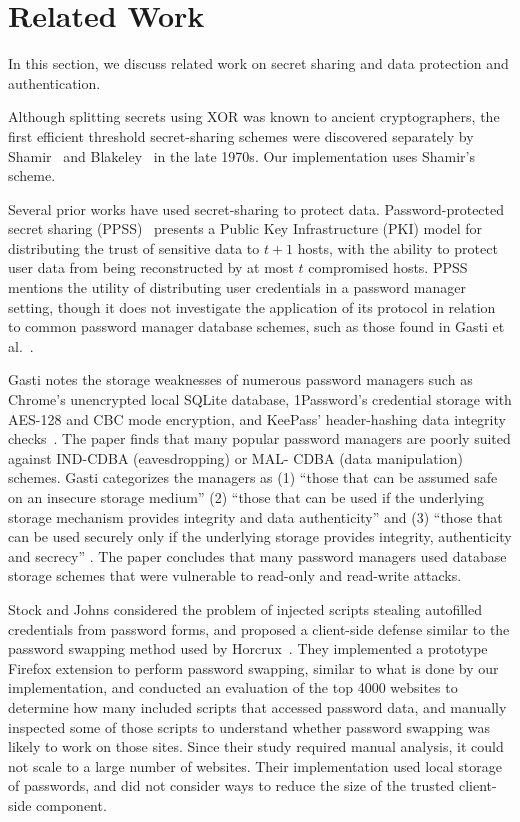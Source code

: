 \section{Related Work} \label{sec:related}

In this section, we discuss related work on secret sharing and data protection and authentication.  

Although splitting secrets using XOR was known to ancient cryptographers, the first efficient threshold secret-sharing schemes were discovered separately by Shamir~\cite{shamir1979share} and Blakeley~\cite{blakley1979safeguarding} in the late 1970s.  Our implementation uses Shamir's scheme. 

Several prior works have used secret-sharing to protect data. Password-protected secret sharing (PPSS)~\cite{bagherzandi2011password} presents a Public Key Infrastructure (PKI) model for distributing the trust of sensitive data to $t+1$ hosts, with the ability to protect user data from being reconstructed by at most $t$ compromised hosts. PPSS mentions the utility of distributing user credentials in a password manager setting, though it does not investigate the application of its protocol in relation to common password manager database schemes, such as those found in Gasti et al.~\cite{gasti2012security}. 

Gasti notes the storage weaknesses of numerous password managers such as Chrome's 
unencrypted local SQLite database, 1Password's credential storage with AES-128 and CBC 
mode encryption, and KeePass' header-hashing data integrity checks~\cite{gasti2012security}. The paper finds that 
many popular password managers are poorly suited against IND-CDBA (eavesdropping) or MAL-
CDBA (data manipulation) schemes. Gasti categorizes the managers as (1) ``those that can 
be assumed safe on an insecure storage medium'' (2) ``those that can be used
if the underlying storage mechanism provides integrity and data authenticity'' and (3) ``those that can be used securely only if the underlying storage provides integrity, 
authenticity and secrecy'' . 
The paper concludes that many password managers used database storage schemes that were vulnerable to read-only and read-write attacks.

Stock and Johns considered the problem of injected scripts stealing autofilled credentials from password forms, and proposed a client-side defense similar to the password swapping method used by Horcrux~\cite{Stock2014}. They implemented a prototype Firefox extension to perform password swapping, similar to what is done by our implementation, and conducted an evaluation of the top 4000 websites to determine how many included scripts that accessed password data, and manually inspected some of those scripts to understand whether password swapping was likely to work on those sites. Since their study required manual analysis, it could not scale to a large number of websites. Their implementation used local storage of passwords, and did not consider ways to reduce the size of the trusted client-side component. 

